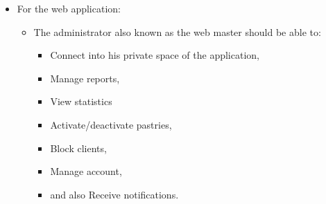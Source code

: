 \documentclass[12pt,a4paper]{report}
\begin{document}
	\begin{itemize}
		\item For the web application:
		\begin{itemize}
			\item  The administrator also known as the web master should be able to:
			\begin{itemize}
				\item Connect into his private space of the application,
				\item Manage reports,
				\item View statistics
				\item Activate/deactivate pastries,
				\item Block clients,
				\item Manage account,
				\item and also Receive notifications.
				

\end{itemize}
\end{itemize}
\end{itemize}
\end{document}
